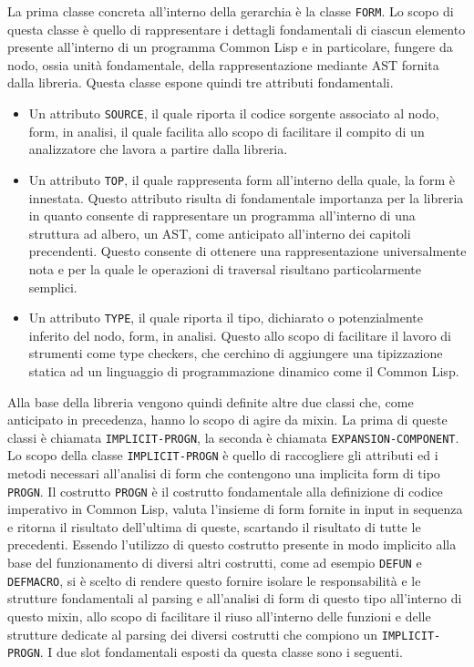 La prima classe concreta all’interno della gerarchia è la classe \texttt{FORM}. Lo scopo di questa classe è quello di rappresentare i dettagli fondamentali di ciascun elemento presente all’interno di un programma Common Lisp e in particolare, fungere da nodo, ossia unità fondamentale, della rappresentazione mediante AST fornita dalla libreria. Questa classe espone quindi tre attributi fondamentali.\\

\begin{itemize}

\item Un attributo \texttt{SOURCE}, il quale riporta il codice sorgente associato al nodo, form, in analisi, il quale facilita allo scopo di facilitare il compito di un analizzatore che lavora a partire dalla libreria.

\item Un attributo \texttt{TOP}, il quale rappresenta form all’interno della quale, la form è innestata. Questo attributo risulta di fondamentale importanza per la libreria in quanto consente di rappresentare un programma all’interno di una struttura ad albero, un AST, come anticipato all’interno dei capitoli precendenti. Questo consente di ottenere una rappresentazione universalmente nota e per la quale le operazioni di traversal risultano particolarmente semplici.
    
\item Un attributo \texttt{TYPE}, il quale riporta il tipo, dichiarato o potenzialmente inferito del nodo, form, in analisi. Questo allo scopo di facilitare il lavoro di strumenti come type checkers, che cerchino di aggiungere una tipizzazione statica ad un linguaggio di programmazione dinamico come il Common Lisp.

\end{itemize}


Alla base della libreria vengono quindi definite altre due classi che, come anticipato in precedenza, hanno lo scopo di agire da mixin. La prima di queste classi è chiamata \texttt{IMPLICIT-PROGN}, la seconda è chiamata \texttt{EXPANSION-COMPONENT}.\\

Lo scopo della classe \texttt{IMPLICIT-PROGN} è quello di raccogliere gli attributi ed i metodi necessari all’analisi di form che contengono una implicita form di tipo \texttt{PROGN}. Il costrutto \texttt{PROGN} è il costrutto fondamentale alla definizione di codice imperativo in Common Lisp, valuta l’insieme di form fornite in input in sequenza e ritorna il risultato dell’ultima di queste, scartando il risultato di tutte le precedenti. Essendo l’utilizzo di questo costrutto presente in modo implicito alla base del funzionamento di diversi altri costrutti, come ad esempio \texttt{DEFUN} e \texttt{DEFMACRO}, si è scelto di rendere questo fornire isolare le responsabilità e le strutture fondamentali al parsing e all’analisi di form di questo tipo all’interno di questo mixin, allo scopo di facilitare il riuso all’interno delle funzioni e delle strutture dedicate al parsing dei diversi costrutti che compiono un \texttt{IMPLICIT-PROGN}. I due slot fondamentali esposti da questa classe sono i seguenti.

